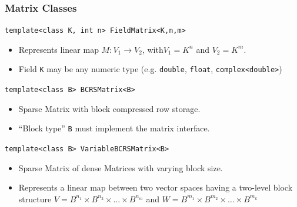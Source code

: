 \begin{frame} \frametitle{Matrix Classes}
  \begin{block}{\lstinline!template<class K, int n> FieldMatrix<K,n,m>!}
    \begin{itemize}
    \item Represents linear map $M: V_1 \to V_2$, with$V_1=K^n$ and
      $V_2=K^m$.
      \item Field \lstinline!K! may be any numeric type (e.g.  
        \lstinline!double!, \lstinline!float!,
        \lstinline!complex<double>!)
    \end{itemize}
  \end{block}
  \begin{block}{ \lstinline!template<class B> BCRSMatrix<B>!}
    \begin{itemize}
    \item Sparse Matrix with block compressed row storage.
    \item ``Block type'' \lstinline!B! must implement the matrix interface.
    \end{itemize}
  \end{block}
  \begin{block}{\lstinline!template<class B> VariableBCRSMatrix<B>!}
    \begin{itemize}
    \item Sparse Matrix of dense Matrices with varying block size.
    \item Represents a linear map between two vector spaces having a two-level
block structure $V=B^{n_1}\times B^{n_2}\times\ldots \times B^{n_m}$
and $W=B^{m_1}\times B^{m_2}\times\ldots \times B^{m_k}$
    \end{itemize}
  \end{block}
\end{frame}

